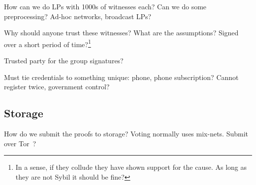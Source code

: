 \begin{frame}

  \pause

  \begin{question}
    How can we do \acp{LP} with 1000s of witnesses each?
    Can we do some preprocessing?
    Ad-hoc networks, broadcast \acp{LP}?
  \end{question}
  \begin{question}
    Why should anyone trust these witnesses?
    What are the assumptions?
    Signed over a short period of time?\footnote{%
      In a sense, if they collude they have shown support for the cause.
      As long as they are not Sybil it should be fine?
    }
  \end{question}
  \begin{question}
    Trusted party for the group signatures?
  \end{question}
  \begin{question}
    Must tie credentials to something unique: phone, phone subscription?
    Cannot register twice, government control?
  \end{question}
\end{frame}

\subsection{Storage}

\begin{frame}
  \begin{question}
    How do we submit the proofs to storage?
    Voting normally uses mix-nets.
    Submit over Tor~\cite{Tor}?
  \end{question}

\end{frame}

